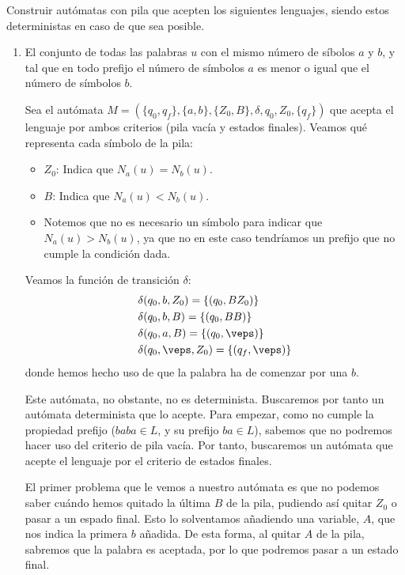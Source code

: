 \begin{ejercicio}\label{ej:1.5.12}
    Construir autómatas con pila que acepten los siguientes lenguajes, siendo estos deterministas en caso de que sea posible.
    \begin{enumerate}
        \item El conjunto de todas las palabras $u$ con el mismo número de síbolos $a$ y $b$, y tal que en todo prefijo el número de símbolos $a$ es menor o igual que el número de símbolos $b$.
        
        Sea el autómata $M = (\{q_0,q_f\},\{a,b\},\{Z_0,B\},\delta,q_0,Z_0,\{q_f\})$ que acepta el lenguaje por ambos criterios (pila vacía y estados finales). Veamos qué representa cada símbolo de la pila:
        \begin{itemize}
            \item $Z_0$: Indica que $N_a(u)=N_b(u)$.
            \item $B$: Indica que $N_a(u)<N_b(u)$.
            \item Notemos que no es necesario un símbolo para indicar que $N_a(u)>N_b(u)$, ya que no en este caso tendríamos un prefijo que no cumple la condición dada.
        \end{itemize}
        Veamos la función de transición $\delta$:
        \begin{align*}
            &\delta(q_0,b,Z_0) = \{(q_0,BZ_0)\} \\
            &\delta(q_0,b,B) = \{(q_0,BB)\} \\
            &\delta(q_0,a,B) = \{(q_0,\veps)\} \\
            &\delta(q_0,\veps,Z_0) = \{(q_f,\veps)\}
        \end{align*}
        donde hemos hecho uso de que la palabra ha de comenzar por una $b$.

        Este autómata, no obstante, no es determinista.
        Buscaremos por tanto un autómata determinista que lo acepte. Para empezar, como no cumple la propiedad prefijo ($baba\in L$, y su prefijo $ba\in L$), sabemos que no podremos hacer uso del criterio de pila vacía. Por tanto, buscaremos un autómata que acepte el lenguaje por el criterio de estados finales.        
        
        El primer problema que le vemos a nuestro autómata es que no podemos saber cuándo hemos quitado la última $B$ de la pila, pudiendo así quitar $Z_0$ o pasar a un espado final. Esto lo solventamos añadiendo una variable, $A$, que nos indica la primera $b$ añadida. De esta forma, al quitar $A$ de la pila, sabremos que la palabra es aceptada, por lo que podremos pasar a un estado final.


\end{enumerate}
\end{ejercicio}
